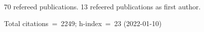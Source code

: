 70 refereed publications. 13 refeered publications as first author.

Total citations~=~2249; h-index~=~23 (2022-01-10)